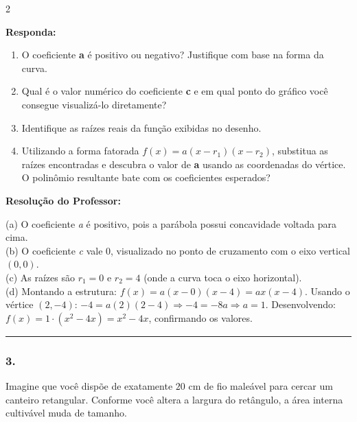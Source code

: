 \begin{multicols*}{2}
\begin{boxresponda}
\textbf{Responda:} 
\begin{enumerate}[label=\alph*), itemsep=\espacoAlt]
\item O coeficiente \textbf{a} é positivo ou negativo? Justifique com base na forma da curva.
\item Qual é o valor numérico do coeficiente \textbf{c} e em qual ponto do gráfico você consegue visualizá-lo diretamente?
\item Identifique as raízes reais da função exibidas no desenho.
\item Utilizando a forma fatorada $f(x) = a(x - r_1)(x - r_2)$, substitua as raízes encontradas e descubra o valor de \textbf{a} usando as coordenadas do vértice. O polinômio resultante bate com os coeficientes esperados?
\end{enumerate}
\end{boxresponda}

\ifgabarito
    \begin{tcolorbox}[colback=CorTitUm!5, colframe=CorTitUm, boxrule=1pt, arc=4pt, left=6pt, right=6pt, top=6pt, bottom=6pt]
    \small\textbf{\textcolor{CorTitUm}{Resolução do Professor:}}\par\vspace{0.1cm}
    \color{CinzaEscuro}
    (a) O coeficiente \textit{a} é positivo, pois a parábola possui concavidade voltada para cima. \\
    (b) O coeficiente \textit{c} vale $0$, visualizado no ponto de cruzamento com o eixo vertical $(0,0)$. \\
    (c) As raízes são $r_1 = 0$ e $r_2 = 4$ (onde a curva toca o eixo horizontal). \\
    (d) Montando a estrutura: $f(x) = a(x - 0)(x - 4) = ax(x-4)$. Usando o vértice $(2, -4)$: $-4 = a(2)(2-4) \Rightarrow -4 = -8a \Rightarrow a = 1$. Desenvolvendo: $f(x) = 1 \cdot (x^2 - 4x) = x^2 - 4x$, confirmando os valores.
    \end{tcolorbox}
\fi

\par\vspace{\espacoQuestao}

\noindent\textcolor{CorLinha}{\rule{\linewidth}{0.5pt}} 
\par\vspace{\espacoPreQuestao}
\subsubsection*{3.} Imagine que você dispõe de exatamente $20\text{ cm}$ de fio maleável para cercar um canteiro retangular. Conforme você altera a largura do retângulo, a área interna cultivável muda de tamanho.


\end{multicols*}
